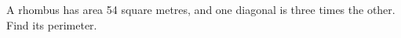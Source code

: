 A rhombus has area 54 square metres, and one diagonal is three times the other. Find its perimeter.
